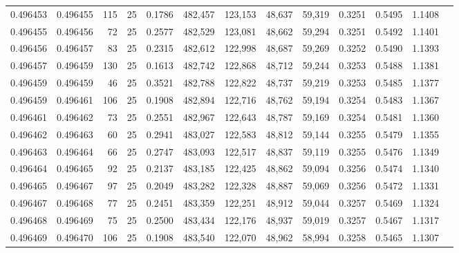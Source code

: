 \begin{tabular}{rrrrrrrrrrrrr}
0.496453 & 0.496455 &   115 &  25 &                                     0.1786 & 482,457 & 123,153 &  48,637 &  59,319 & 0.3251 & 0.5495 & 1.1408 \\
0.496455 & 0.496456 &    72 &  25 &                                     0.2577 & 482,529 & 123,081 &  48,662 &  59,294 & 0.3251 & 0.5492 & 1.1401 \\
0.496456 & 0.496457 &    83 &  25 &                                     0.2315 & 482,612 & 122,998 &  48,687 &  59,269 & 0.3252 & 0.5490 & 1.1393 \\
0.496457 & 0.496459 &   130 &  25 &                                     0.1613 & 482,742 & 122,868 &  48,712 &  59,244 & 0.3253 & 0.5488 & 1.1381 \\
0.496459 & 0.496459 &    46 &  25 &                                     0.3521 & 482,788 & 122,822 &  48,737 &  59,219 & 0.3253 & 0.5485 & 1.1377 \\
0.496459 & 0.496461 &   106 &  25 &                                     0.1908 & 482,894 & 122,716 &  48,762 &  59,194 & 0.3254 & 0.5483 & 1.1367 \\
0.496461 & 0.496462 &    73 &  25 &                                     0.2551 & 482,967 & 122,643 &  48,787 &  59,169 & 0.3254 & 0.5481 & 1.1360 \\
0.496462 & 0.496463 &    60 &  25 &                                     0.2941 & 483,027 & 122,583 &  48,812 &  59,144 & 0.3255 & 0.5479 & 1.1355 \\
0.496463 & 0.496464 &    66 &  25 &                                     0.2747 & 483,093 & 122,517 &  48,837 &  59,119 & 0.3255 & 0.5476 & 1.1349 \\
0.496464 & 0.496465 &    92 &  25 &                                     0.2137 & 483,185 & 122,425 &  48,862 &  59,094 & 0.3256 & 0.5474 & 1.1340 \\
0.496465 & 0.496467 &    97 &  25 &                                     0.2049 & 483,282 & 122,328 &  48,887 &  59,069 & 0.3256 & 0.5472 & 1.1331 \\
0.496467 & 0.496468 &    77 &  25 &                                     0.2451 & 483,359 & 122,251 &  48,912 &  59,044 & 0.3257 & 0.5469 & 1.1324 \\
0.496468 & 0.496469 &    75 &  25 &                                     0.2500 & 483,434 & 122,176 &  48,937 &  59,019 & 0.3257 & 0.5467 & 1.1317 \\
0.496469 & 0.496470 &   106 &  25 &                                     0.1908 & 483,540 & 122,070 &  48,962 &  58,994 & 0.3258 & 0.5465 & 1.1307 \\

\end{tabular}
